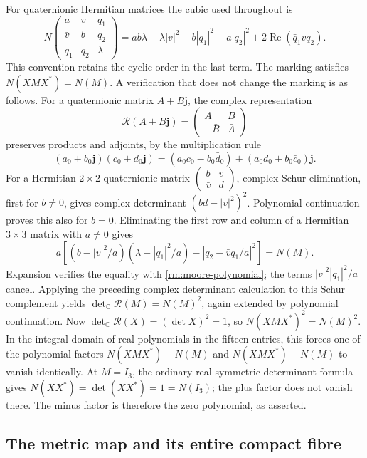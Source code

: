 For quaternionic Hermitian matrices the cubic used throughout is
\begin{equation}\label{rm:moore-polynomial}
 N\!\begin{pmatrix}a&v&q_1\\\bar v&b&q_2\\
 \bar q_1&\bar q_2&\lambda\end{pmatrix}
 =ab\lambda-\lambda|v|^2-b|q_1|^2-a|q_2|^2
       +2\operatorname{Re}(\bar q_1vq_2).
\end{equation}
This convention retains the cyclic order in the last term.
The marking satisfies $N(XMX^*)=N(M)$. A verification that does not
change the marking is as follows. For a quaternionic matrix $A+B\mathbf j$,
the complex representation
\[
 \mathcal R(A+B\mathbf j)
 =\begin{pmatrix}A&B\\-\bar B&\bar A\end{pmatrix}
\]
preserves products and adjoints, by the multiplication rule
\begin{equation}\label{rm:quaternion-product}
 (a_0+b_0\mathbf j)(c_0+d_0\mathbf j)
 =(a_0c_0-b_0\bar d_0)+(a_0d_0+b_0\bar c_0)\mathbf j.
\end{equation}
For a Hermitian $2\times2$ quaternionic matrix
$\left(\begin{smallmatrix}b&v\\\bar v&d\end{smallmatrix}\right)$,
complex Schur elimination, first for $b\ne0$, gives complex determinant
$(bd-|v|^2)^2$. Polynomial continuation proves this also for $b=0$.
Eliminating the first row and column of a Hermitian $3\times3$ matrix
with $a\ne0$ gives
\[
 a\left[(b-|v|^2/a)(\lambda-|q_1|^2/a)
             -|q_2-\bar vq_1/a|^2\right]=N(M).
\]
Expansion verifies the equality with \eqref{rm:moore-polynomial}; the
terms $|v|^2|q_1|^2/a$ cancel. Applying the preceding complex determinant
calculation to this Schur complement yields
$\det_{\mathbb C}\mathcal R(M)=N(M)^2$, again extended by polynomial
continuation. Now $\det_{\mathbb C}\mathcal R(X)=(\det X)^2=1$, so
$N(XMX^*)^2=N(M)^2$. In the integral domain of real polynomials in the
fifteen entries, this forces one of the polynomial factors
$N(XMX^*)-N(M)$ and $N(XMX^*)+N(M)$ to vanish identically. At $M=I_3$,
the ordinary real symmetric determinant formula gives
$N(XX^*)=\det(XX^*)=1=N(I_3)$; the plus factor does not vanish there.
The minus factor is therefore the zero polynomial, as asserted.

\subsection{The metric map and its entire compact fibre}

